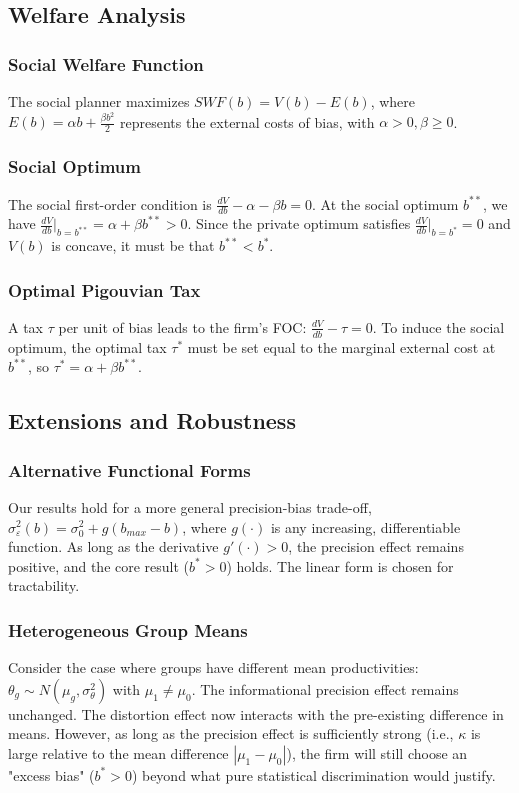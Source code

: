 \subsection{Welfare Analysis}

\subsubsection{Social Welfare Function}
The social planner maximizes $SWF(b) = V(b) - E(b)$, where $E(b) = \alpha b + \frac{\beta b^2}{2}$ represents the external costs of bias, with $\alpha > 0, \beta \ge 0$.

\subsubsection{Social Optimum}
The social first-order condition is $\frac{dV}{db} - \alpha - \beta b = 0$. At the social optimum $b^{**}$, we have $\frac{dV}{db}\big|_{b=b^{**}} = \alpha + \beta b^{**} > 0$. Since the private optimum satisfies $\frac{dV}{db}\big|_{b=b^*} = 0$ and $V(b)$ is concave, it must be that $b^{**} < b^*$.

\subsubsection{Optimal Pigouvian Tax}
A tax $\tau$ per unit of bias leads to the firm's FOC: $\frac{dV}{db} - \tau = 0$. To induce the social optimum, the optimal tax $\tau^*$ must be set equal to the marginal external cost at $b^{**}$, so $\tau^* = \alpha + \beta b^{**}$.

\subsection{Extensions and Robustness}

\subsubsection{Alternative Functional Forms}
Our results hold for a more general precision-bias trade-off, $\sigma_\varepsilon^2(b) = \sigma_0^2 + g(b_{max} - b)$, where $g(\cdot)$ is any increasing, differentiable function. As long as the derivative $g'(\cdot)>0$, the precision effect remains positive, and the core result ($b^*>0$) holds. The linear form is chosen for tractability.

\subsubsection{Heterogeneous Group Means}
Consider the case where groups have different mean productivities: $\theta_g \sim N(\mu_g, \sigma_\theta^2)$ with $\mu_1 \neq \mu_0$. The informational precision effect remains unchanged. The distortion effect now interacts with the pre-existing difference in means. However, as long as the precision effect is sufficiently strong (i.e., $\kappa$ is large relative to the mean difference $|\mu_1 - \mu_0|$), the firm will still choose an "excess bias" ($b^*>0$) beyond what pure statistical discrimination would justify.